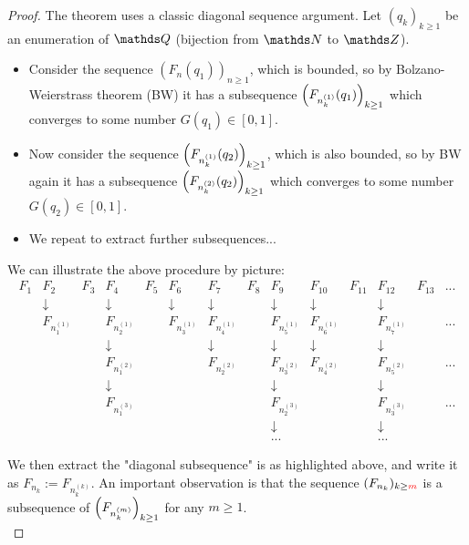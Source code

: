 \begin{proof}
The theorem uses a classic diagonal sequence argument. Let $(q_k)_{k\geq 1}$ be an enumeration of $\Q$ (bijection from $\N$ to $\Z$). 
\begin{itemize}
\item Consider the sequence $(F_n(q_1))_{n\geq 1}$, which is bounded, so by Bolzano-Weierstrass theorem (BW) it has a subsequence $\left( F_{n_k^{(1)}}(q_1) \right)_{k \geq 1}$ which converges to some number $G(q_1) \in [0,1]$. 
\item Now consider the sequence $\left( F_{n_k^{(1)}}(q_2) \right)_{k\geq 1}$, which is also bounded, so by BW again it has a subsequence $\left( F_{n_k^{(2)}}(q_2) \right)_{k \geq 1}$ which converges to some number $G(q_2) \in [0,1]$.
\item We repeat to extract further subsequences...
\end{itemize}
We can illustrate the above procedure by picture:
\begin{equation*}
\begin{array}{cccccccccccccc}
F_1 & \boxed{F_2} & F_3 & F_4 & F_5 & F_6 & \boxed{F_7} & F_8 & F_9 & F_{10} & F_{11} & \boxed{F_{12}} & F_{13} & ... \\
 & \downarrow & & \downarrow &  & \downarrow & \downarrow & & \downarrow & \downarrow & & \downarrow & & \\
 & \boxed{F_{n^{(1)}_1}} & & F_{n^{(1)}_2} & & F_{n^{(1)}_3} & \boxed{F_{n^{(1)}_4}} & & F_{n^{(1)}_5} & F_{n^{(1)}_6} & & \boxed{F_{n^{(1)}_7}} & & ... \\
 & & & \downarrow & & & \downarrow & & \downarrow & \downarrow & & \downarrow & & \\
 & & & F_{n^{(2)}_1} & & & \boxed{F_{n^{(2)}_2}} & & F_{n^{(2)}_3} & F_{n^{(2)}_4} & & \boxed{F_{n^{(2)}_5}} & & ... \\
 & & & \downarrow & & & & & \downarrow & & & \downarrow & & \\
 & & & F_{n^{(3)}_1} & & & & & F_{n^{(3)}_2} & & & \boxed{F_{n^{(3)}_3}} & & ... \\
 & & & & & & & & \downarrow & & & \downarrow & & \\
 & & & & & & & & ... & & & ... & & 
\end{array}
\end{equation*}
\vspace{12pt}

We then extract the "diagonal subsequence" is as highlighted above, and write it as $F_{n_k} := F_{n_k^{(k)}}$. An important observation is that the sequence $(F_{n_k})_{k \geq \textcolor{red}{m}}$ is a subsequence of $\left( F_{n^{(m)}_k} \right)_{k\geq 1}$ for any $m \geq 1$. \\


\end{proof}
